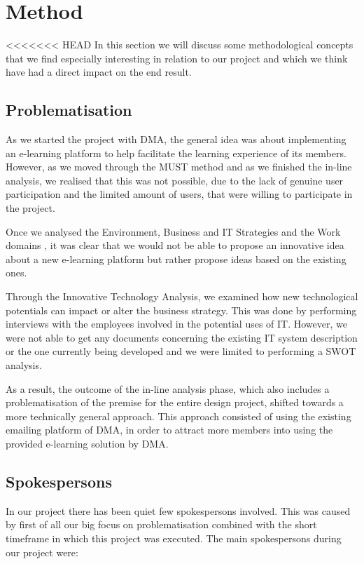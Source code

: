 \section{Method}


<<<<<<< HEAD
In this section we will discuss some methodological concepts that we find especially interesting in relation to our project and which we think have had a direct impact on the end result. 

\subsection{Problematisation}
As we started the project with DMA, the general idea was about implementing an e-learning platform to help facilitate the learning experience of its members. However, as we moved through the MUST method and as we finished the in-line analysis, we realised that this was not possible, due to the lack of genuine user participation\cite{bodker} and the limited amount of users, that were willing to participate in the project. 

Once we analysed the Environment, Business and IT Strategies and the Work domains \cite{bodker}, it was clear that we would not be able to propose an innovative idea about a new e-learning platform but rather propose ideas based on the existing ones. 

Through the Innovative Technology Analysis\cite{bodker}, we examined how new technological potentials can impact or alter the business strategy. This was done by performing interviews with the employees involved in the potential uses of IT. However, we were not able to get any documents concerning the existing IT system description or the one currently being developed and we were limited to performing a SWOT analysis.

As a result, the outcome of the in-line analysis phase, which also includes a problematisation of the premise for the entire design project, shifted towards a more technically general approach. This approach consisted of using the existing emailing platform of DMA, in order to attract more members into using the provided e-learning solution by DMA.


\subsection{Spokespersons}
In our project there has been quiet few spokespersons involved. This was caused by first of all our big focus on problematisation combined with the short timeframe in which this project was executed. The main spokespersons during our project were:


